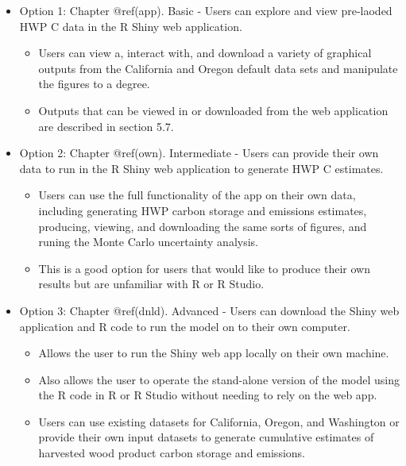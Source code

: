\documentclass[
  openany]{book}
\providecommand{\tightlist}{%
  \setlength{\itemsep}{0pt}\setlength{\parskip}{0pt}}
\begin{document}
\begin{itemize}
\tightlist
\item
  Option 1: Chapter @ref(app). Basic - Users can explore and view
  pre-laoded HWP C data in the R Shiny web application.

  \begin{itemize}
  \tightlist
  \item
    Users can view a, interact with, and download a variety of graphical
    outputs from the California and Oregon default data sets and
    manipulate the figures to a degree.
  \item
    Outputs that can be viewed in or downloaded from the web application
    are described in section 5.7.\\
  \end{itemize}
\item
  Option 2: Chapter @ref(own). Intermediate - Users can provide their
  own data to run in the R Shiny web application to generate HWP C
  estimates.

  \begin{itemize}
  \tightlist
  \item
    Users can use the full functionality of the app on their own data,
    including generating HWP carbon storage and emissions estimates,
    producing, viewing, and downloading the same sorts of figures, and
    runing the Monte Carlo uncertainty analysis.\\
  \item
    This is a good option for users that would like to produce their own
    results but are unfamiliar with R or R Studio.
  \end{itemize}
\item
  Option 3: Chapter @ref(dnld). Advanced - Users can download the Shiny
  web application and R code to run the model on to their own computer.

  \begin{itemize}
  \tightlist
  \item
    Allows the user to run the Shiny web app locally on their own
    machine.\\
  \item
    Also allows the user to operate the stand-alone version of the model
    using the R code in R or R Studio without needing to rely on the web
    app.
  \item
    Users can use existing datasets for California, Oregon, and
    Washington or provide their own input datasets to generate
    cumulative estimates of harvested wood product carbon storage and
    emissions.
  \end{itemize}
\end{itemize}
\end{document}

